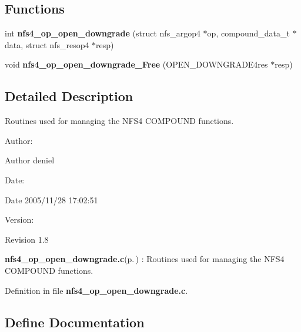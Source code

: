 \subsection*{Functions}
\begin{CompactItemize}
\item 
int {\bf nfs4\_\-op\_\-open\_\-downgrade} (struct nfs\_\-argop4 $\ast$op, compound\_\-data\_\-t $\ast$data, struct nfs\_\-resop4 $\ast$resp)
\item 
void {\bf nfs4\_\-op\_\-open\_\-downgrade\_\-Free} (OPEN\_\-DOWNGRADE4res $\ast$resp)
\end{CompactItemize}


\subsection{Detailed Description}
Routines used for managing the NFS4 COMPOUND functions. 

\begin{Desc}
\item[Author:]\begin{Desc}
\item[Author]deniel \end{Desc}
\end{Desc}
\begin{Desc}
\item[Date:]\begin{Desc}
\item[Date]2005/11/28 17:02:51 \end{Desc}
\end{Desc}
\begin{Desc}
\item[Version:]\begin{Desc}
\item[Revision]1.8 \end{Desc}
\end{Desc}
{\bf nfs4\_\-op\_\-open\_\-downgrade.c}{\rm (p.\,\pageref{nfs4__op__open__downgrade_8c})} : Routines used for managing the NFS4 COMPOUND functions.

Definition in file {\bf nfs4\_\-op\_\-open\_\-downgrade.c}.

\subsection{Define Documentation}

